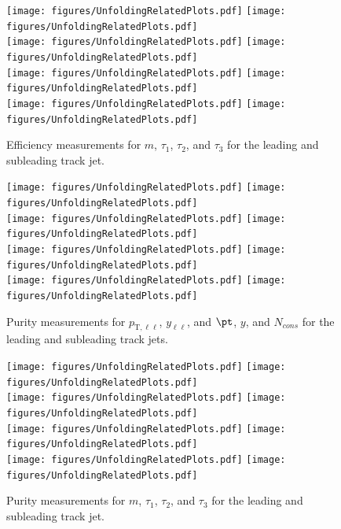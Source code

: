 \begin{figure}[h!]
  \centering
  \texttt{[image: figures/UnfoldingRelatedPlots.pdf]}
  \texttt{[image: figures/UnfoldingRelatedPlots.pdf]} \\
  \texttt{[image: figures/UnfoldingRelatedPlots.pdf]}
  \texttt{[image: figures/UnfoldingRelatedPlots.pdf]} \\
  \texttt{[image: figures/UnfoldingRelatedPlots.pdf]}
  \texttt{[image: figures/UnfoldingRelatedPlots.pdf]} \\
  \texttt{[image: figures/UnfoldingRelatedPlots.pdf]}
  \texttt{[image: figures/UnfoldingRelatedPlots.pdf]}
  \caption{Efficiency measurements for $m$, $\tau_1$, $\tau_2$, and $\tau_3$ for the leading and subleading track jet.}
  \label{fig:Eff2}
\end{figure}

\begin{figure}[h!]
  \centering
  \texttt{[image: figures/UnfoldingRelatedPlots.pdf]}
  \texttt{[image: figures/UnfoldingRelatedPlots.pdf]} \\
  \texttt{[image: figures/UnfoldingRelatedPlots.pdf]}
  \texttt{[image: figures/UnfoldingRelatedPlots.pdf]} \\
  \texttt{[image: figures/UnfoldingRelatedPlots.pdf]}
  \texttt{[image: figures/UnfoldingRelatedPlots.pdf]} \\
  \texttt{[image: figures/UnfoldingRelatedPlots.pdf]}
  \texttt{[image: figures/UnfoldingRelatedPlots.pdf]}
  \caption{Purity measurements for $p_{\text{T},\ell\ell}$, $y_{\ell\ell}$, and $\pt$, $y$, and $N_{cons}$ for the leading and subleading track jets.}
  \label{fig:Pur1}
\end{figure}

\begin{figure}[h!]
  \centering
  \texttt{[image: figures/UnfoldingRelatedPlots.pdf]}
  \texttt{[image: figures/UnfoldingRelatedPlots.pdf]} \\
  \texttt{[image: figures/UnfoldingRelatedPlots.pdf]}
  \texttt{[image: figures/UnfoldingRelatedPlots.pdf]} \\
  \texttt{[image: figures/UnfoldingRelatedPlots.pdf]}
  \texttt{[image: figures/UnfoldingRelatedPlots.pdf]} \\
  \texttt{[image: figures/UnfoldingRelatedPlots.pdf]}
  \texttt{[image: figures/UnfoldingRelatedPlots.pdf]}
  \caption{Purity measurements for $m$, $\tau_1$, $\tau_2$, and $\tau_3$ for the leading and subleading track jet.}
  \label{fig:Pur2}
\end{figure}

